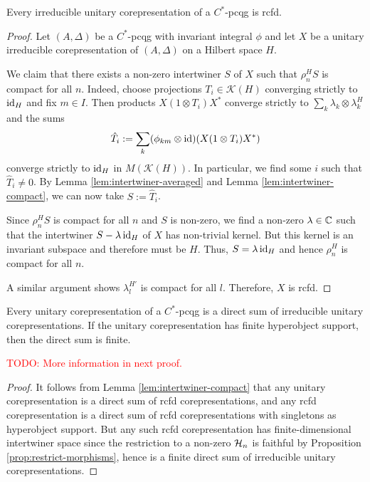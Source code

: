 \begin{Prop} \label{prop:corep-rcfd}
Every irreducible unitary corepresentation of a  $C^{*}$-pcqg is rcfd.
\end{Prop}
\begin{proof}
  Let $(A,\Delta)$ be a $C^{*}$-pcqg with invariant integral $\phi$ and
  let $X$ be a unitary irreducible corepresentation of $(A,\Delta)$ on
  a Hilbert space $H$.

  We claim that there exists a non-zero intertwiner $S$ of $X$ such
  that $\rho^{H}_{n}S$ is compact for all $n$.  Indeed, choose
  projections $T_{i} \in \mathcal{K}(H)$ converging strictly to
  $\operatorname{id}_{H}$ and fix $m\in I$. Then products $X(1\otimes T_{i})X^{*}$
  converge strictly to $\sum_{k} \lambda_{k} \otimes \lambda_{k}^{H}$
  and the sums
  \begin{align*}
    \hat T_{i} := \sum_{k}(\phi_{km} \otimes \operatorname{id})(X(1\otimes T_{i})X^{*})
  \end{align*}
  converge strictly to $\operatorname{id}_{H}$ in $M(\mathcal{K}(H))$. In  particular, we find some $i$ such that $\hat T_{i}\neq 0$.  By Lemma  \ref{lem:intertwiner-averaged} and  Lemma   \ref{lem:intertwiner-compact}, we can now take $S:=\hat T_{i}$.

  Since $\rho^{H}_{n}S$ is compact for all $n$ and $S$ is non-zero, we  find a non-zero $\lambda\in \mathbb{C}$ such that the  intertwiner $S-\lambda\operatorname{id}_{H}$ of $X$ has non-trivial kernel.  But  this kernel is an invariant subspace and therefore must be $H$.  Thus, $S=\lambda\operatorname{id}_{H}$ and hence $\rho^{H}_{n}$ is compact for all  $n$.

  A similar argument shows $\lambda^{H'}_{l}$ is compact for all  $l$. Therefore, $X$ is rcfd.
\end{proof}



\begin{Cor} \label{cor:corep-decompose} Every unitary corepresentation
  of a $C^{*}$-pcqg  is a direct sum of irreducible unitary
  corepresentations. If the unitary corepresentation has finite hyperobject support, then the
  direct sum is finite.
\end{Cor}
\textcolor{red}{TODO: More information in next proof.}
\begin{proof} It follows from Lemma \ref{lem:intertwiner-compact} that any unitary corepresentation is a direct sum of rcfd corepresentations, and any rcfd corepresentation is a direct sum of rcfd corepresentations with singletons as hyperobject support. But any such rcfd corepresentation has finite-dimensional intertwiner space since the restriction to a non-zero $\mathcal{H}_n$ is faithful by Proposition \ref{prop:restrict-morphisms}, hence is a finite direct sum of irreducible unitary corepresentations. 
\end{proof} 

